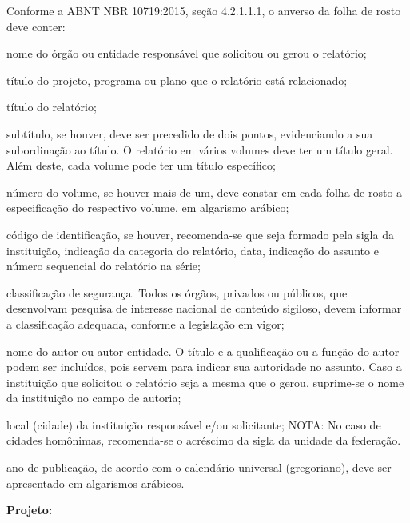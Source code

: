 

{
  \ABNTEXchapterfont

  \vspace*{\fill}
  
  Conforme a ABNT NBR 10719:2015, seção 4.2.1.1.1, o anverso da folha de rosto deve conter:
  
  \begin{alineas}
    \item nome do órgão ou entidade responsável que solicitou ou gerou o relatório; 
    \item título do projeto, programa ou plano que o relatório está relacionado;
    \item título do relatório;
    \item subtítulo, se houver, deve ser precedido de dois pontos, evidenciando a sua subordinação ao título. O relatório em vários volumes deve ter um título geral. Além deste, cada volume pode ter um título específico; 
    \item número do volume, se houver mais de um, deve constar em cada folha de rosto a especificação do respectivo volume, em algarismo arábico; 
    \item código de identificação, se houver, recomenda-se que seja formado pela sigla da instituição, indicação da categoria do relatório, data, indicação do assunto e número sequencial do relatório na série; 
    \item classificação de segurança. Todos os órgãos, privados ou públicos, que desenvolvam pesquisa de interesse nacional de conteúdo sigiloso, devem informar a classificação adequada, conforme a legislação em vigor; 
    \item nome do autor ou autor-entidade. O título e a qualificação ou a função do autor podem ser incluídos, pois servem para indicar sua autoridade no assunto. Caso a instituição que solicitou o relatório seja a mesma que o gerou, suprime-se o nome da instituição no campo de autoria; 
    \item local (cidade) da instituição responsável e/ou solicitante; NOTA: No caso de cidades homônimas, recomenda-se o acréscimo da sigla da unidade da federação.
    \item ano de publicação, de acordo com o calendário universal (gregoriano), deve ser apresentado em algarismos arábicos.
  \end{alineas}

  \imprimirinstituicao
  
  \textbf{Projeto: \projeto}
  
  \imprimirtitulo
  
  
  
  \vspace*{\fill}
}
